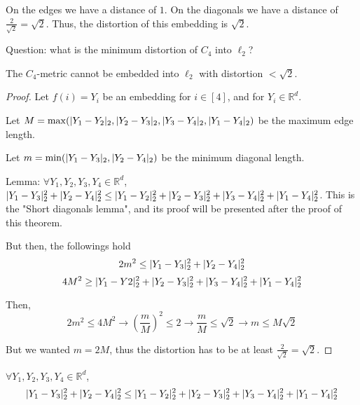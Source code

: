     On the edges we have a distance of $1$. On the diagonals we have a distance of $\frac{2}{\sqrt{2}} = \sqrt{2}$.
    Thus, the distortion of this embedding is $\sqrt{2}$.

    Question: what is the minimum distortion of $C_4$ into $\ell_2$?

    \begin{theorem}
        The $C_4$-metric cannot be embedded into $\ell_2$ with distortion $< \sqrt{2}$.
    \end{theorem}

    \begin{proof}
        Let $f(i) = Y_i$ be an embedding for $i \in [4]$, and for $Y_i \in \mathbb{R}^d$.

        Let $M = \max (\vert Y_1 - Y_2 \vert_2, \vert Y_2 - Y_3 \vert_2, \vert Y_3 - Y_4 \vert_2, \vert Y_1 - Y_4 \vert_2)$ be the maximum edge length.

        Let $m = \min (\vert Y_1 - Y_3 \vert_2, \vert Y_2 - Y_4 \vert_2)$ be the minimum diagonal length.

        Lemma: $\forall Y_1, Y_2, Y_3, Y_4 \in \mathbb{R}^d$, $\vert Y_1 - Y_3 \vert_2^2 + \vert Y_2 - Y_4 \vert_2^2 \leq \vert Y_1 - Y_2 \vert_2^2 + \vert Y_2 - Y_3 \vert_2^2 + \vert Y_3 - Y_4 \vert_2^2 + \vert Y_1 - Y_4 \vert_2^2$.
        This is the "Short diagonals lemma", and its proof will be presented after the proof of this theorem.

        But then, the followings hold
        \[ 2m^2 \leq \vert Y_1 - Y_3 \vert_2^2 + \vert Y_2 - Y_4 \vert_2^2 \]
        \[ 4M^2 \geq \vert Y_1 - Y2 \vert_2^2 + \vert Y_2 - Y_3 \vert_2^2 + \vert Y_3 - Y_4 \vert_2^2 + \vert Y_1 - Y_4 \vert_2^2 \]

        Then,
        \[ 2m^2 \leq 4M^2 \rightarrow (\frac{m}{M})^2 \leq 2 \rightarrow \frac{m}{M} \leq \sqrt{2} \rightarrow m \leq M \sqrt{2} \]

        But we wanted $m = 2M$, thus the distortion has to be at least $\frac{2}{\sqrt{2}} = \sqrt{2}$.
    \end{proof}

    \begin{lemma}
        $\forall Y_1, Y_2, Y_3, Y_4 \in \mathbb{R}^d$,
        \[ \vert Y_1 - Y_3 \vert_2^2 + \vert Y_2 - Y_4 \vert_2^2 \leq \vert Y_1 - Y_2 \vert_2^2 + \vert Y_2 - Y_3 \vert_2^2 + \vert Y_3 - Y_4 \vert_2^2 + \vert Y_1 - Y_4 \vert_2^2 \]
    \end{lemma}

